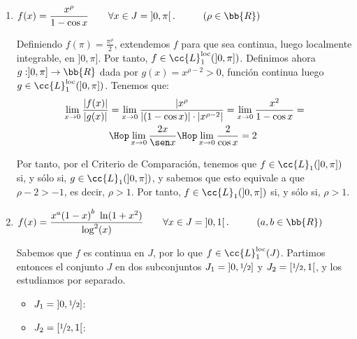 \begin{ejercicio}
\begin{enumerate}
        Por tanto, $f\in \cc{L}_1(J)$ en todo caso, independientemente del valor de $n\in \bb{N}$.

        \item $f(x)=\dfrac{x^\rho}{1-\cos x} \qquad \forall x\in J=\left]0,\pi\right[.\hspace{1cm}(\rho\in \bb{R})$
        
        Definiendo $f(\pi) = \frac{\pi^\rho}{2}$, extendemos $f$ para que sea continua,
        luego localmente integrable, en $]0,\pi]$. Por tanto, $f\in \cc{L}_1^{\text{loc}}(]0,\pi])$.
        Definimos ahora $g:]0,\pi]\to \bb{R}$ dada por $g(x)=x^{\rho-2}>0$, función continua luego $g\in \cc{L}_1^{\text{loc}}(]0,\pi])$.
        Tenemos que:
        \begin{align*}
            \lim_{x\to 0} \dfrac{|f(x)|}{|g(x)|}
            &= \lim_{x\to 0} \dfrac{|x^\rho}{|(1-\cos x)|\cdot |x^{\rho-2}|}
            = \lim_{x\to 0} \dfrac{x^2}{1-\cos x}
            =\\& \Hop \lim_{x\to 0} \dfrac{2x}{\sen x}
            \Hop \lim_{x\to 0} \dfrac{2}{\cos x} = 2
        \end{align*}

        Por tanto, por el Criterio de Comparación, tenemos que $f\in \cc{L}_1(]0,\pi])$ si, y sólo si, $g\in \cc{L}_1(]0,\pi])$, y sabemos que esto equivale a que $\rho-2>-1$, es decir, $\rho>1$.
        Por tanto, $f\in \cc{L}_1(]0,\pi])$ si, y sólo si, $\rho>1$.

        \item $f(x)=\dfrac{x^a{(1-x)}^b~\ln(1+x^2)}{\log^2(x)} \qquad \forall x\in J=\left]0,1\right[.\hspace{1cm}(a,b\in \bb{R})$
        
        Sabemos que $f$ es continua en $J$, por lo que $f\in \cc{L}_1^{\text{loc}}(J)$.
        Partimos entonces el conjunto $J$ en dos subconjuntos $J_1=\left]0,\nicefrac{1}{2}\right]$ y $J_2=\left[\nicefrac{1}{2},1\right[$, y los estudiamos por separado.
        \begin{itemize}
            \item \ul{$J_1=\left]0,\nicefrac{1}{2}\right]$}:
            \item \ul{$J_2=\left[\nicefrac{1}{2}, 1\right[$}:
        \end{itemize}

    \end{enumerate}
\end{ejercicio}
